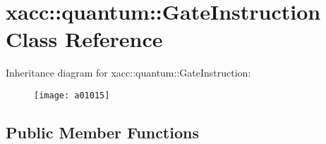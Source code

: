 \hypertarget{a01015}{}\section{xacc\+:\+:quantum\+:\+:Gate\+Instruction Class Reference}
\label{a01015}
Inheritance diagram for xacc\+:\+:quantum\+:\+:Gate\+Instruction\+:\begin{figure}[H]
\begin{center}
\leavevmode
\texttt{[image: a01015]}
\end{center}
\end{figure}
\subsection*{Public Member Functions}
